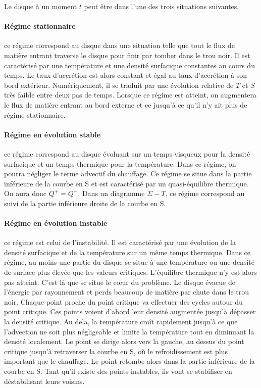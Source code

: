 Le disque à un moment $t$ peut être dans l'une des trois situations suivantes.

\paragraph{Régime stationnaire} ce régime correspond au disque dans une situation telle que tout le flux de matière entrant traverse le disque pour finir par tomber dans le trou noir. Il est caractérisé par une température et une densité surfacique constantes au cours du temps. Le taux d'accrétion est alors constant et égal au taux d'accrétion à son bord extérieur. Numériquement, il se traduit par une évolution relative de $T$ et $S$ très faible entre deux pas de temps. Lorsque ce régime est atteint, on augmentera le flux de matière entrant au bord externe et ce jusqu'à ce qu'il n'y ait plus de régime stationnaire.

\paragraph{Régime en évolution stable} ce régime correspond au disque évoluant sur un temps visqueux pour la densité surfacique et un temps thermique pour la température. Dans ce régime, on pourra négliger le terme advectif du chauffage. Ce régime se situe dans la partie inférieure de la courbe en S et est caractérisé par un quasi-équilibre thermique. On aura donc $Q^+ = Q^-$. Dans un diagramme $\Sigma-T$, ce régime correspond au suivi de la partie inférieure droite de la courbe en S.
\paragraph{Régime en évolution instable} ce régime est celui de l'instabilité. Il est caractérisé par une évolution de la densité surfacique et de la température sur un même temps thermique. Dans ce régime, au moins une partie du disque se situe à une température ou une densité de surface plus élevée que les valeurs critiques. L'équilibre thermique n'y est alors pas atteint. C'est là que se situe le cœur du problème. Le disque évacue de l'énergie par rayonnement et perds beaucoup de matière par chute dans le trou noir. Chaque point proche du point critique va effectuer des cycles autour du point critique. Ces points voient d'abord leur densité augmentée jusqu'à dépasser la densité critique. Au dela, la température croît rapidement jusqu'à ce que l'advection ne soit plus négligeable et limite la température tout en diminuant la densité localement. Le point se dirige alors vers la gauche, au dessus du point critique jusqu'à retraverser la courbe en S, où le refroidissement est plus important que le chauffage. Le point retombe alors dans la partie inférieure de la courbe en S. Tant qu'il existe des points instables, ils vont se stabiliser en déstabilisant leurs voisins.

